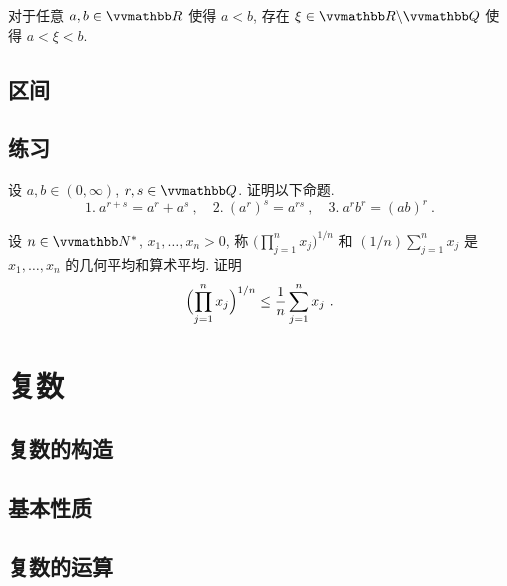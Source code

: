 \begin{proposition}\label{prop:irQ-density-in-R}
    对于任意 \(a, b \in \R\) 使得 \(a < b\), 存在 \(\xi \in \R \backslash \Q\) 使得 \(a < \xi < b\).
\end{proposition}

\subsection{区间}

\subsection{练习}

\begin{exercise}\label{ex:ratio-power-of-real-numbers}
    设 \(a, b \in (0, \infty)\), \(r, s \in \Q\). 证明以下命题.
    \[
        1.\ a^{r + s} = a^r + a^s\ ,\quad 2.\ (a^r)^s = a^{r s}\ ,\quad 3.\ a^r b^r = (a b)^r\ .
    \]
\end{exercise}

\begin{exercise}[算术-几何平均值不等式]
    设 \(n \in \N^\ast\), \(x_1, \ldots, x_n > 0\), 称 \(\bigl(\prod_{j = 1}^n x_j\bigr)^{1 / n}\) 和 \((1 / n) \sum_{j = 1}^n x_j\) 是 \(x_1, \ldots, x_n\) 的几何平均和算术平均. 证明
    \[
        \Bigl(\prod_{j = 1}^n x_j\Bigr)^{1 / n} \leq \frac{1}{n} \sum_{j = 1}^n x_j\ .
    \]
\end{exercise}

\newpage

\section{复数}

\subsection{复数的构造}

\subsection{基本性质}

\begin{remark}\label{rem:complex-numbers-property}
    
\end{remark}

\subsection{复数的运算}

